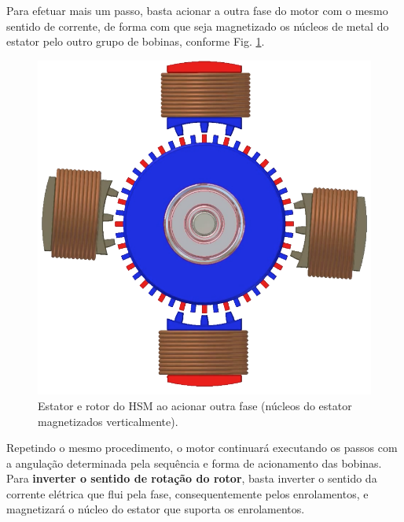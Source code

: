	Para efetuar mais um passo, basta acionar a outra fase do motor com o mesmo sentido de corrente, de forma com que seja magnetizado os núcleos de metal do estator pelo outro grupo de bobinas, conforme Fig. \ref{acionamento2}.
	
	\begin{figure}[H]
		\centering 
		\includegraphics[scale=0.25]{images/hsm_operation/etapa2}
		\caption{Estator e rotor do HSM ao acionar outra fase (núcleos do estator magnetizados verticalmente).}
		\label{acionamento2}
	\end{figure}
	
	Repetindo o mesmo procedimento, o motor continuará executando os passos com a angulação determinada pela sequência e forma de acionamento das bobinas. Para \textbf{inverter o sentido de rotação do rotor}, basta inverter o sentido da corrente elétrica que flui pela fase, consequentemente pelos enrolamentos, e magnetizará o núcleo do estator que suporta os enrolamentos. 
	